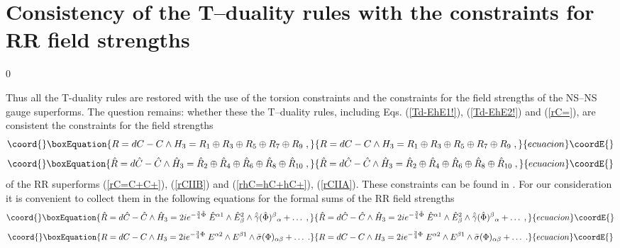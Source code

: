 \documentclass[a4paper,11pt]{article}
\begin{document}
\section{Consistency of the T--duality rules with the constraints for 
RR field strengths} 
\setcounter{equation}0

Thus all the T-duality rules are restored with the use 
of the torsion constraints and the constraints for the field strengths 
of the NS--NS gauge superforms. The question remains: whether these  
 the T--duality rules, including 
Eqs. (\ref{Td-EhE1!}), (\ref{Td-EhE2!}) and (\ref{rC=}), 
 are consistent the constraints 
for the field strengths 
\begin{equation}\coord{}\boxEquation{\label{R=R+R+}
R=dC - C \wedge H_3 = 
R_1 \oplus R_3 \oplus R_5  \oplus R_7  \oplus R_9  \; , 
}{R=dC - C \wedge H_3 = 
R_1 \oplus R_3 \oplus R_5  \oplus R_7  \oplus R_9  \; , 
}{ecuacion}\coordE{}\end{equation}
\begin{equation}\coord{}\boxEquation{\label{hR=hR+hR+}
\hat{R}=d\hat{C} - \hat{C} \wedge \hat{H}_3 = 
\hat{R}_2 \oplus \hat{R}_4 \oplus \hat{R}_6  \oplus \hat{R}_8  \oplus 
\hat{R}_{10} \; ,  
}{\hat{R}=d\hat{C} - \hat{C} \wedge \hat{H}_3 = 
\hat{R}_2 \oplus \hat{R}_4 \oplus \hat{R}_6  \oplus \hat{R}_8  \oplus 
\hat{R}_{10} \; ,  
}{ecuacion}\coordE{}\end{equation}
of the RR superforms (\ref{rC=C+C+}), (\ref{rCIIB}) and 
(\ref{rhC=hC+hC+}), (\ref{rCIIA}). 
These constraints can be found in \cite{c0}. 
For our consideration it is convenient to collect them 
in the following equations for the formal sums of the 
RR field strengths
\begin{equation}\coord{}\boxEquation{\label{hR=hc}
\hat{R}=d\hat{C} - \hat{C} \wedge \hat{H}_3 = 
 2i e^{-{3\over 4}\hat{\Phi}} \; 
\hat{E}^{ {\a}1}
\wedge
\hat{E}^2_{ {\b}}
\wedge \hat{\bar\gamma}(\hat{\Phi})^{ {\b}}{}_{ {\a}}
  + \ldots \;   ,
}{\hat{R}=d\hat{C} - \hat{C} \wedge \hat{H}_3 = 
 2i e^{-{3\over 4}\hat{\Phi}} \; 
\hat{E}^{ {\a}1}
\wedge
\hat{E}^2_{ {\b}}
\wedge \hat{\bar\gamma}(\hat{\Phi})^{ {\b}}{}_{ {\a}}
  + \ldots \;   ,
}{ecuacion}\coordE{}\end{equation}
\begin{equation}\coord{}\boxEquation{\label{R=c} 
R=dC - C \wedge H_3 = 
2i e^{-{3\over 4}{\Phi}} \; 
{E}^{ {\a}2}
\wedge
{E}^{ {\b}1}
\wedge \bar{\sigma}({\Phi})_{ {\a} {\b}}
   + \ldots \;   .  
}{R=dC - C \wedge H_3 = 
2i e^{-{3\over 4}{\Phi}} \; 
{E}^{ {\a}2}
\wedge
{E}^{ {\b}1}
\wedge \bar{\sigma}({\Phi})_{ {\a} {\b}}
   + \ldots \;   .  
}{ecuacion}\coordE{}\end{equation}
\end{document}
